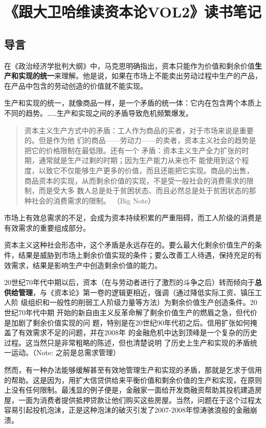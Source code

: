 
\part{《跟大卫哈维读资本论VOL2》读书笔记}\label{davidcapitalvol2}

\chapter{导言}\label{ux5bfcux8a00}

在《政治经济学批判大纲》中，马克思明确指出，资本只能作为价值和剩余价值\textbf{生产和实现的统一}来理解。他是说，如果在市场上不能卖出劳动过程中生产的产品，在产品中包含的劳动创造的价值就不能实现。

生产和实现的统一，就像商品一样，是一个矛盾的统一体：它内在包含两个本质上不同的趋势。……生产和实现之间的矛盾导致危机频繁爆发。

\begin{quotation}
  资本主义生产方式中的矛盾：工人作为商品的买者，对于市场来说是重要的。但是作为他
  们的商品——劳动力——的卖者，资本主义社会的趋势是把它的价格限制在最低限。还有一个
  矛盾：资本主义生产全力扩张的时期，通常就是生产过剩的时期；因为生产能力从来也不
  能使用到这个程度，以致它不仅能够生产更多的价值，而且还能把它实现。商品的出售，
  商品资本的实现，从而剩余价值的实现，不是受一般社会的消费需求的限制，而是受大多
  数人总是处于贫困状态、而且必然总是处于贫困状态的那种社会的消费需求的限制。 （Big Note）


\end{quotation}

市场上有效总需求的不足，会成为资本持续积累的严重阻碍，而工人阶级的消费是有效需求的重要组成部分。

资本主义这种社会形态中，这个矛盾是永远存在的。要么最大化剩余价值生产的条件，结果是威胁到市场上剩余价值实现的条件；要么改善工人待遇，保持充足的有效需求，结果是影响生产中创造剩余价值的能力。

20世纪70年代中期以后，资本（在与劳动者进行了激烈的斗争之后）转而倾向于\textbf{总
  供给管理}，与《资本论》第一卷的逻辑更相近，强调（通过降低实际工资、镇压工人阶
级组织和一般性的削弱工人阶级力量等方法）为剩余价值生产创造条件。20世纪70年代中期
开始的新自由主义反革命解了剩余价值生产的燃眉之急，但代价是加剧了剩余价值实现的问
题，特别是在20世纪90年代初之后。信用扩张如何掩盖了有效需求不足的问题，并在2008年
的金融危机中达到顶峰是一个复杂的历史过程。这当然只是非常粗略的陈述，但也清楚说明
了历史上生产和实现的矛盾统一运动。（Note: 之前是总需求管理）

然而，有一种办法能够缓解甚至有效地管理生产和实现的矛盾，那就是乞求于信用的帮助。这是因为，用扩大信贷供给来平衡价值和剩余价值的生产和实现，在原则上没有任何限制。最浅显的例子便是，金融家一面给开发商融资帮助其投机建造房屋，一面为消费者提供抵押贷款让他们购买这些房屋。当然，问题在于这个过程太容易引起投机泡沫，正是这种泡沫的破灭引发了2007-2008年惊涛骇浪般的金融崩溃。

